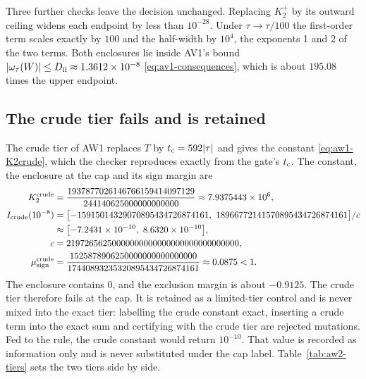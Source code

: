 Three further checks leave the decision unchanged. Replacing $K_2^+$ by its
outward ceiling widens each endpoint by less than $10^{-28}$. Under
$\tau\to\tau/100$ the first-order term scales exactly by $100$ and the
half-width by $10^4$, the exponents 1 and 2 of the two terms. Both enclosures
lie inside AV1's bound $|\omega_\tau(W)|\le D_{\rm ii}\approx1.3612\times10^{-8}$
\eqref{eq:av1-consequences}, which is about $195.08$ times the upper endpoint.

\subsection{The crude tier fails and is retained}
\label{sec:aw2-crude}
The crude tier of AW1 replaces $T$ by $t_{\rm c}=592|\tau|$ and gives the
constant \eqref{eq:aw1-K2crude}, which the checker reproduces exactly from the
gate's $t_{\rm c}$. The constant, the enclosure at the cap and its sign margin
are
\begin{equation}
 \begin{aligned}
 K_2^{\rm crude}&=\frac{1937877026146766159414097129}{244140625000000000000}
 \approx7.9375443\times10^{6},\\
 I_{\rm crude}(10^{-8})
 &=\bigl[-15915014329070895434726874161,\ 18966772141570895434726874161\bigr]/c\\
 &\approx\bigl[-7.2431\times10^{-10},\ 8.6320\times10^{-10}\bigr],\\
 c&=21972656250000000000000000000000000000,\\
 \mu_{\rm sign}^{\rm crude}
 &=\frac{1525878906250000000000000000}{17440893235320895434726874161}\approx0.0875<1 .
 \end{aligned}
 \label{eq:aw2-crude}
\end{equation}
The enclosure contains $0$, and the exclusion margin is about $-0.9125$. The
crude tier therefore fails at the cap. It is retained as a limited-tier control and is never mixed into the
exact tier: labelling the crude constant exact, inserting a crude term into
the exact sum and certifying with the crude tier are rejected mutations. Fed
to the rule, the crude constant would return $10^{-10}$. That value is
recorded as information only and is never substituted under the cap label.
Table~\ref{tab:aw2-tiers} sets the two tiers side by side.


